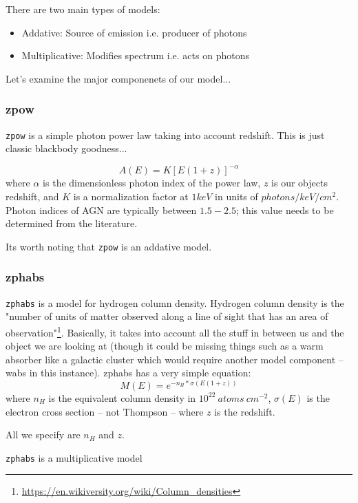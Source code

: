 \documentclass[11pt,letterpaper]{article}
\begin{document}
There are two main types of models:
\begin{itemize}
	\item Addative: Source of emission i.e. producer of photons
	\item Multiplicative: Modifies spectrum i.e. acts on photons
\end{itemize}

Let's examine the major componenets of our model...

\subsubsection{zpow}
\texttt{zpow} is a simple photon power law taking into account redshift. This is just classic blackbody goodness...

\begin{equation}
	A(E) = K[E(1+z)]^{-\alpha}
\end{equation}
where $\alpha$ is the dimensionless photon index of the power law, $z$ is our objects redshift, and $K$ is a normalization factor  at $1keV$ in units of $photons/keV/cm^2$. Photon indices of AGN are typically between $1.5 - 2.5$; this value needs to be determined from the literature.

Its worth noting that \texttt{zpow} is an addative model.

\subsubsection{zphabs}
\texttt{zphabs} is a model for hydrogen column density. Hydrogen column density is the "number of units of matter observed along a line of sight that has an area of observation"\footnote{\href{https://en.wikiversity.org/wiki/Column_densities}{https://en.wikiversity.org/wiki/Column\_densities}}. Basically, it takes into account all the stuff in between us and the object we are looking at (though it could be missing things such as a warm absorber like a galactic cluster which would require another model component -- wabs in this instance). zphabs has a very simple equation:
\begin{equation}
	M(E) = e^{-n_H*\sigma(E(1+z))}
\end{equation}
where $n_H$ is the equivalent column density in $10^{22} \ atoms \ cm^{-2}$, $\sigma(E)$ is the electron cross section -- not Thompson -- where $z$ is the redshift.

All we specify are $n_H$ and $z$.

\texttt{zphabs} is a multiplicative model
\end{document}

